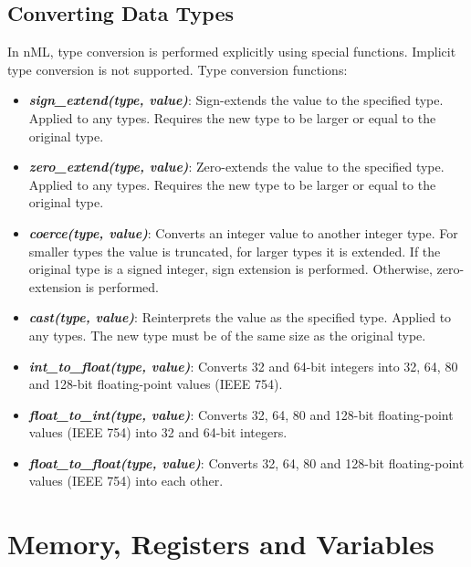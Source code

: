 \documentclass[oneside,final,14pt]{extreport}
\begin{document}
\subsection{Converting Data Types}

In nML, type conversion is performed explicitly using special functions.
Implicit type conversion is not supported. Type conversion functions:

\begin{itemize}
\item \textbf{\textit{sign{\_}extend(type, value)}}:
Sign-extends the value to the specified type. Applied to any types. Requires
the new type to be larger or equal to the original type.

\item \textbf{\textit{zero{\_}extend(type, value)}}:
Zero-extends the value to the specified type. Applied to any types. Requires
the new type to be larger or equal to the original type.

\item \textbf{\textit{coerce(type, value)}}:
Converts an integer value to another integer type. For smaller types the value
is truncated, for larger types it is extended. If the original type is a signed
integer, sign extension is performed. Otherwise, zero-extension is performed.

\item \textbf{\textit{cast(type, value)}}:
Reinterprets the value as the specified type. Applied to any types. The new type
must be of the same size as the original type.

\item \textbf{\textit{int{\_}to{\_}float(type, value)}}:
Converts 32 and 64-bit integers into 32, 64, 80 and 128-bit floating-point
values (IEEE 754).

\item \textbf{\textit{float{\_}to{\_}int(type, value)}}:
Converts 32, 64, 80 and 128-bit floating-point values (IEEE 754) into 32 and
64-bit integers.

\item \textbf{\textit{float{\_}to{\_}float(type, value)}}:
Converts 32, 64, 80 and 128-bit floating-point values (IEEE 754) into each
other.

\end{itemize}


\section{Memory, Registers and Variables}
\end{document}
